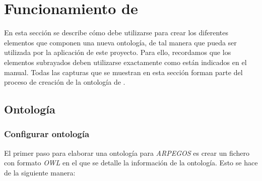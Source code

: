 
\newpage
\section{Funcionamiento de \protege}
En esta sección se describe cómo debe utilizarse \protege para crear los diferentes elementos que componen una nueva ontología,
de tal manera que pueda ser utilizada por la aplicación de este proyecto. Para ello, recordamos que los elementos subrayados 
deben utilizarse exactamente como están indicados en el manual. Todas las capturas que se muestran en esta sección forman 
parte del proceso de creación de la ontología de \anima. 

\subsection{Ontología}
\subsubsection{Configurar ontología}
El primer paso para elaborar una ontología para \textit{ARPEGOS} es crear un fichero con formato \textit{OWL} en el que 
se detalle la información de la ontología. Esto se hace de la siguiente manera: 

